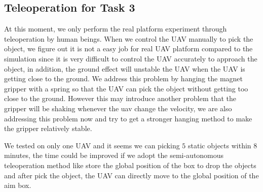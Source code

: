 \documentclass{standalone}
\begin{document}
\subsection{Teleoperation for Task 3}
At this moment, we only perform the real platform experiment through teleoperation by human beings. When we control the UAV manually to pick the object, we figure out it is not a easy job for real UAV platform compared to the simulation since it is very difficult to control the UAV accurately to approach the object, in addition, the ground effect will unstable the UAV when the UAV is getting close to the ground. We address this problem by hanging the magnet gripper with a spring so that the UAV can pick the object without getting too close to the ground. However this may introduce another problem that the gripper will be shaking whenever the uav change the velocity, we are also addressing this problem now and try to get a stronger hanging method to make the gripper relatively stable.

We tested on only one UAV and it seems we can picking $5$ static objects within $8$ minutes, the time could be improved if we adopt the semi-autonomous teleoperation method like store the global position of the box to drop the objects and after pick the object, the UAV can directly move to the global position of the aim box.
\end{document}
